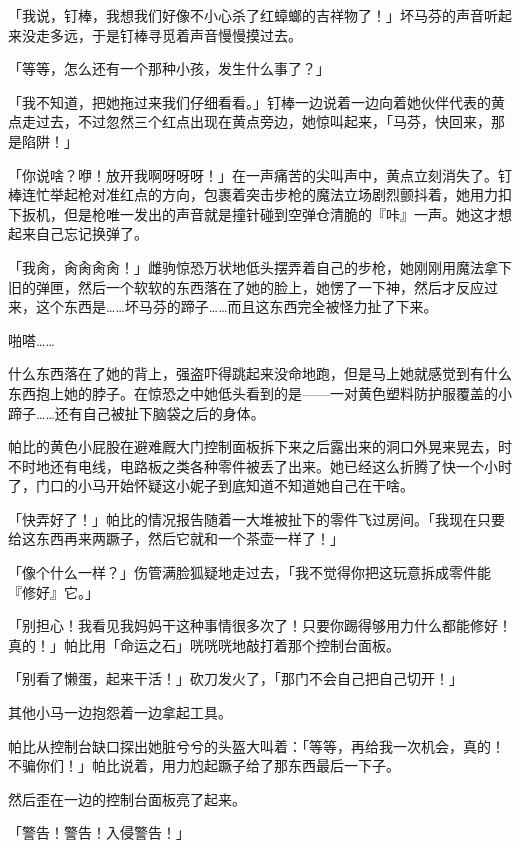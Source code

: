 「我说，钉棒，我想我们好像不小心杀了红蟑螂的吉祥物了！」坏马芬的声音听起来没走多远，于是钉棒寻觅着声音慢慢摸过去。

「等等，怎么还有一个那种小孩，发生什么事了？」

「我不知道，把她拖过来我们仔细看看。」钉棒一边说着一边向着她伙伴代表的黄点走过去，不过忽然三个红点出现在黄点旁边，她惊叫起来，「马芬，快回来，那是陷阱！」

「你说啥？咿！放开我啊呀呀呀！」在一声痛苦的尖叫声中，黄点立刻消失了。钉棒连忙举起枪对准红点的方向，包裹着突击步枪的魔法立场剧烈颤抖着，她用力扣下扳机，但是枪唯一发出的声音就是撞针碰到空弹仓清脆的『咔』一声。她这才想起来自己忘记换弹了。

「我肏，肏肏肏肏！」雌驹惊恐万状地低头摆弄着自己的步枪，她刚刚用魔法拿下旧的弹匣，然后一个软软的东西落在了她的脸上，她愣了一下神，然后才反应过来，这个东西是……坏马芬的蹄子……而且这东西完全被怪力扯了下来。

啪嗒……{}

什么东西落在了她的背上，强盗吓得跳起来没命地跑，但是马上她就感觉到有什么东西抱上她的脖子。在惊恐之中她低头看到的是——一对黄色塑料防护服覆盖的小蹄子……还有自己被扯下脑袋之后的身体。

\horizonline


帕比的黄色小屁股在避难厩大门控制面板拆下来之后露出来的洞口外晃来晃去，时不时地还有电线，电路板之类各种零件被丢了出来。她已经这么折腾了快一个小时了，门口的小马开始怀疑这小妮子到底知道不知道她自己在干啥。

「快弄好了！」帕比的情况报告随着一大堆被扯下的零件飞过房间。「我现在只要给这东西再来两蹶子，然后它就和一个茶壶一样了！」

「像个什么一样？」伤管满脸狐疑地走过去，「我不觉得你把这玩意拆成零件能『修好』它。」

「别担心！我看见我妈妈干这种事情很多次了！只要你踢得够用力什么都能修好！真的！」帕比用「命运之石」咣咣咣地敲打着那个控制台面板。

「别看了懒蛋，起来干活！」砍刀发火了，「那门不会自己把自己切开！」

其他小马一边抱怨着一边拿起工具。

帕比从控制台缺口探出她脏兮兮的头盔大叫着：「等等，再给我一次机会，真的！不骗你们！」帕比说着，用力尥起蹶子给了那东西最后一下子。

然后歪在一边的控制台面板亮了起来。

「{\mt 警告！警告！入侵警告！}」

